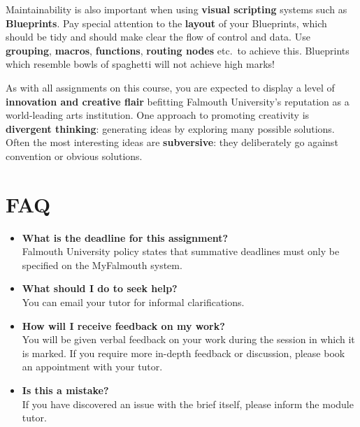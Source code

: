 \documentclass{../../fal_assignment}
\begin{document}
Maintainability is also important when using \textbf{visual scripting} systems such as \textbf{Blueprints}.
Pay special attention to the \textbf{layout} of your Blueprints,
which should be tidy and should make clear the flow of control and data.
Use \textbf{grouping}, \textbf{macros}, \textbf{functions}, \textbf{routing nodes} etc.\ to achieve this.
Blueprints which resemble bowls of spaghetti will not achieve high marks!

As with all assignments on this course, you are expected to display a level of
\textbf{innovation and creative flair} befitting Falmouth University's reputation as a world-leading
arts institution.
One approach to promoting creativity is
\textbf{divergent thinking}: generating ideas by exploring many possible solutions.
Often the most interesting ideas are \textbf{subversive}: they deliberately go against
convention or obvious solutions.

\section*{FAQ}

\begin{itemize}
	\item 	\textbf{What is the deadline for this assignment?} \\ 
    		Falmouth University policy states that summative deadlines must only be specified on the MyFalmouth system.
    		
	\item 	\textbf{What should I do to seek help?} \\ 
    		You can email your tutor for informal clarifications.  
    		
	\item 	\textbf{How will I receive feedback on my work?} \\ 
    		You will be given verbal feedback on your work during the session in which it is marked.
    		If you require more in-depth feedback or discussion, please book an appointment with your tutor.
    		
    	\item 	\textbf{Is this a mistake?} \\ 	
    		If you have discovered an issue with the brief itself, please inform the module tutor.
    		
\end{itemize}
\end{document}
